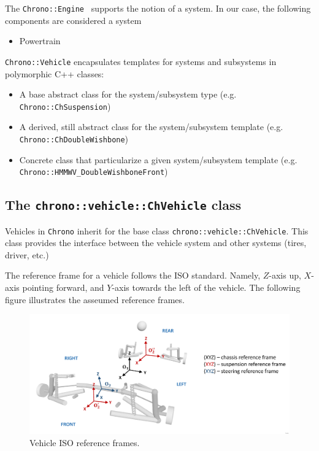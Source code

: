 The \lstinline{Chrono::Engine } supports the notion of a system. In our case, the following components are considered a system

\begin{itemize}
\item Powertrain
\end{itemize}

\lstinline{Chrono::Vehicle} encapsulates templates for systems and subsystems in polymorphic C++ classes:

\begin{itemize}
\item A base abstract class for the system/subsystem type (e.g. \lstinline{Chrono::ChSuspension})
\item A derived, still abstract class for the system/subsystem template (e.g.  \lstinline{Chrono::ChDoubleWishbone})
\item Concrete class that particularize a given system/subsystem template (e.g. \lstinline{Chrono::HMMWV_DoubleWishboneFront})
\end{itemize}

\subsection{The \lstinline{chrono::vehicle::ChVehicle} class}

Vehicles in \lstinline{Chrono} inherit for the base class \lstinline{chrono::vehicle::ChVehicle}. 
This class provides the interface between the vehicle system and other systems (tires, driver, etc.)

The reference frame for a vehicle follows the ISO standard. 
Namely, $Z$-axis up, $X$-axis pointing forward, and $Y$-axis towards the left of the vehicle. The following figure illustrates
the asseumed reference frames.


\begin{figure}[!htb]
\begin{center}
\includegraphics[scale=0.290]{img/vehicle_iso_ref_frame.jpeg}
\end{center}
\caption{Vehicle ISO reference frames.}
\label{vehicle_iso_ref_frame}
\end{figure}

